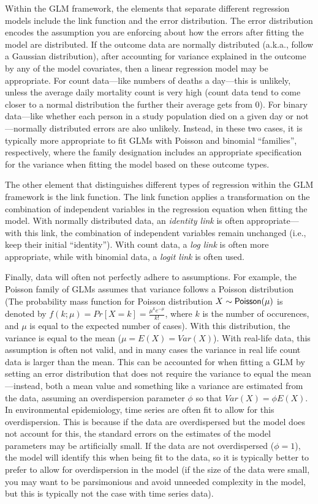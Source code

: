 \documentclass[
]{book}
\begin{document}
Within the GLM framework, the elements that separate different regression models
include the link function and the error distribution. The error distribution
encodes the assumption you are enforcing about how the errors after fitting the
model are distributed. If the outcome data are normally distributed (a.k.a.,
follow a Gaussian distribution), after accounting for variance explained in the
outcome by any of the model covariates, then a linear regression model may be
appropriate. For count data---like numbers of deaths a day---this is unlikely,
unless the average daily mortality count is very high (count data tend to
come closer to a normal distribution the further their average gets from
0). For binary data---like whether each person in a study population died on
a given day or not---normally distributed errors are also unlikely. Instead,
in these two cases, it is typically more appropriate to fit GLMs with
Poisson and binomial ``families'', respectively, where the family designation
includes an appropriate specification for the variance when fitting the model
based on these outcome types.

The other element that distinguishes different types of regression within
the GLM framework is the link function. The link function applies a transformation
on the combination of independent variables in the regression equation
when fitting the model. With normally distributed data, an \emph{identity link}
is often appropriate---with this link, the combination of independent variables
remain unchanged (i.e., keep their initial ``identity''). With count data, a
\emph{log link} is often more appropriate, while with binomial data, a \emph{logit link}
is often used.

Finally, data will often not perfectly adhere to assumptions. For example, the
Poisson family of GLMs assumes that variance follows a Poisson distribution
(The probability mass function for Poisson distribution \(X \sim {\sf Poisson}(\mu)\) is denoted by \(f(k;\mu)=Pr[X=k]= \displaystyle \frac{\mu^{k}e^{-\mu}}{k!}\), where
\(k\) is the number of occurences, and \(\mu\) is equal to the expected number of
cases). With this distribution, the variance is equal to the mean (\(\mu=E(X)=Var(X)\)). With real-life data, this assumption is often not valid, and in many cases the variance in real life count data is larger than the mean. This can be accounted for when fitting a GLM by setting an error distribution that does not require the variance to equal the mean---instead, both a mean value and something like a
variance are estimated from the data, assuming an overdispersion parameter \(\phi\)
so that \(Var(X)=\phi E(X)\). In environmental epidemiology, time series
are often fit to allow for this overdispersion. This is because if the data are overdispersed but the model does not account for this, the standard errors on the
estimates of the model parameters may be artificially small. If the data are not overdispersed (\(\phi=1\)), the model will identify this when being fit to the data,
so it is typically better to prefer to allow for overdispersion in the model
(if the size of the data were small, you may want to be parsimonious and avoid
unneeded complexity in the model, but this is typically not the case with time
series data).
\end{document}
